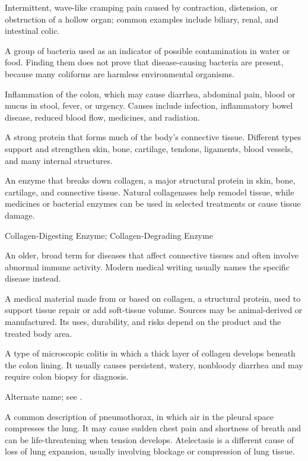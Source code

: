  Intermittent, wave-like cramping pain caused by contraction, distension, or obstruction of a hollow organ; common examples include biliary, renal, and intestinal colic.

 A group of bacteria used as an indicator of possible contamination in water or food. Finding them does not prove that disease-causing bacteria are present, because many coliforms are harmless environmental organisms.

 Inflammation of the colon, which may cause diarrhea, abdominal pain, blood or mucus in stool, fever, or urgency. Causes include infection, inflammatory bowel disease, reduced blood flow, medicines, and radiation.

 A strong protein that forms much of the body's connective tissue. Different types support and strengthen skin, bone, cartilage, tendons, ligaments, blood vessels, and many internal structures.

 An enzyme that breaks down collagen, a major structural protein in skin, bone, cartilage, and connective tissue. Natural collagenases help remodel tissue, while medicines or bacterial enzymes can be used in selected treatments or cause tissue damage.

\synonyms
Collagen-Digesting Enzyme; Collagen-Degrading Enzyme

 An older, broad term for diseases that affect connective tissues and often involve abnormal immune activity. Modern medical writing usually names the specific disease instead.

 A medical material made from or based on collagen, a structural protein, used to support tissue repair or add soft-tissue volume. Sources may be animal-derived or manufactured. Its uses, durability, and risks depend on the product and the treated body area.

 A type of microscopic colitis in which a thick layer of collagen develops beneath the colon lining. It usually causes persistent, watery, nonbloody diarrhea and may require colon biopsy for diagnosis.

 Alternate name; see .

 A common description of pneumothorax, in which air in the pleural space compresses the lung. It may cause sudden chest pain and shortness of breath and can be life-threatening when tension develops. Atelectasis is a different cause of loss of lung expansion, usually involving blockage or compression of lung tissue.

